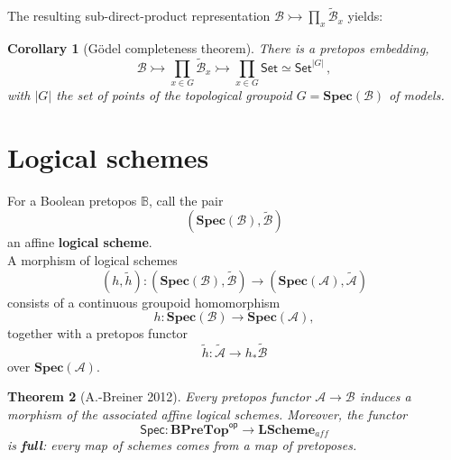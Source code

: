 \documentclass[11pt]{article}
\newcommand{\B}{\ensuremath{\mathbb{B}}}
\newcommand{\Set}{\ensuremath{\mathsf{Set}}}
\newtheorem{theorem}{Theorem}
\newtheorem{corollary}[theorem]{Corollary}
\theoremstyle{remark}
\theoremstyle{definition}
\newcommand{\myemph}[1]{\textbf{#1}}
\begin{document}
The resulting sub-direct-product representation $\mathcal{B}\rightarrowtail \prod_{x}\tilde{\mathcal{B}}_x$ yields:\\[1ex]

\begin{corollary}[G\"odel completeness theorem] 
There is a pretopos embedding,
\[
\mathcal{B}\rightarrowtail \prod_{x\in G}\tilde{\mathcal{B}}_{x} \rightarrowtail \prod_{x\in G}\Set \simeq \Set^{|G|}\,,
\]
with $|G|$ the set of points of the topological groupoid $G = \mathbf{Spec}(\mathcal{B})$ of models.
\end{corollary}
\medskip

%
%

\section{Logical schemes}

For a Boolean pretopos $\B$, call the pair $$(\mathbf{Spec}(\mathcal{B}), \tilde{\mathcal{B}})$$ an affine \myemph{logical scheme}.  \\

A morphism of logical schemes
\[
(h, \tilde{h}) : (\mathbf{Spec}(\mathcal{B}), \tilde{\mathcal{B}}) \to (\mathbf{Spec}(\mathcal{A}), \tilde{\mathcal{A}})
\]
consists of a continuous groupoid homomorphism 
\[
h : \mathbf{Spec}(\mathcal{B}) \to \mathbf{Spec}(\mathcal{A}),
\]
together with a pretopos functor 
\[
\tilde{h} : \tilde{\mathcal{A}} \to h_*\tilde{\mathcal{B}}
\]
over $\mathbf{Spec}(\mathcal{A})$.


\begin{theorem}[A.-Breiner 2012]
Every pretopos functor $\mathcal{A} \to \mathcal{B}$ induces a morphism of the associated affine logical schemes.  Moreover, the  functor
\[
\mathsf{Spec} : \mathbf{BPreTop}^{\mathsf{op}} \longrightarrow \mathbf{LScheme}_{aff}
\]
is \myemph{full}: every map of schemes comes from a map of pretoposes.
\end{theorem}
\end{document}
